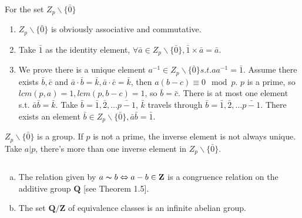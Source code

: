 \begin{answer}
    For the set $Z_p\backslash\{\bar{0}\}$
    \begin{enumerate}
        \item $Z_p\backslash\{\bar{0}\}$ is obviously associative and commutative.
        \item Take $\bar{1}$ as the identity element, $\forall \bar{a}\in Z_p\backslash\{\bar{0}\}, \bar{1}\times \bar{a}=\bar{a}$.
        \item We prove there is a unique element $a^{-1}\in Z_p\backslash\{\bar{0}\} s.t. aa^{-1}=\bar{1} $. Assume there exists $\bar{b},\bar{c}$ and $\bar{a}\cdot\bar{b}=\bar{k},\bar{a}\cdot\bar{c}=\bar{k}$, then $a(b-c)\equiv 0\mod{p}$. $p$ is a prime, so $lcm(p,a)=1,  lcm(p,b-c)=1$, so $\bar{b}=\bar{c}$. There is at most one element s.t. $\bar{a}\bar{b}=\bar{k}$. Take $\bar{b}=\bar{1}, \bar{2},\dots\bar{p-1}$, $\bar{k}$ travels through $\bar{b}=\bar{1}, \bar{2},\dots\bar{p-1}$. There exists an element $\bar{b}\in Z_p\backslash\{\bar{0}\}, \bar{a}\bar{b}=\bar{1}$.
    \end{enumerate}
    $Z_p\backslash\{\bar{0}\}$ is a group. If $p$ is not a prime, the inverse element is not always unique. Take $a|p$, there's more than one inverse element in $Z_p\backslash\{\bar{0}\}$.
\end{answer}

$$ $$

\begin{ex}
    \begin{enumerate}[(a)]
        \item The relation given by $a \thicksim b \Leftrightarrow a - b \in \mathbf{Z}$ is a congruence relation on the additive group $\mathbf{Q}$ [see Theorem 1.5].
        \item The set $\mathbf{Q}/\mathbf{Z}$ of equivalence classes is an infinite abelian group.
    \end{enumerate}
\end{ex}

